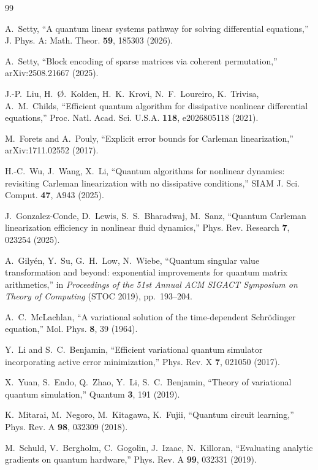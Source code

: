 \documentclass[aps,prx,twocolumn,notitlepage,superscriptaddress,floatfix,10pt]{revtex4-2}
\begin{document}
\begin{thebibliography}{99}

 A.~Setty, ``A quantum linear systems pathway for solving differential equations,''
J. Phys. A: Math. Theor. \textbf{59}, 185303 (2026).

 A.~Setty, ``Block encoding of sparse matrices via coherent permutation,''
arXiv:2508.21667 (2025).

 J.-P.~Liu, H.~{\O}.~Kolden, H.~K.~Krovi, N.~F.~Loureiro, K.~Trivisa, A.~M.~Childs,
``Efficient quantum algorithm for dissipative nonlinear differential equations,'' Proc. Natl. Acad.
Sci. U.S.A. \textbf{118}, e2026805118 (2021).

 M.~Forets and A.~Pouly, ``Explicit error bounds for Carleman linearization,''
arXiv:1711.02552 (2017).

 H.-C.~Wu, J.~Wang, X.~Li, ``Quantum algorithms for nonlinear dynamics: revisiting
Carleman linearization with no dissipative conditions,'' SIAM J. Sci. Comput. \textbf{47}, A943
(2025).

 J.~Gonzalez-Conde, D.~Lewis, S.~S.~Bharadwaj, M.~Sanz, ``Quantum Carleman
linearization efficiency in nonlinear fluid dynamics,'' Phys. Rev. Research \textbf{7}, 023254 (2025).

 A.~Gily{\'e}n, Y.~Su, G.~H.~Low, N.~Wiebe, ``Quantum singular value
transformation and beyond: exponential improvements for quantum matrix arithmetics,'' in
\emph{Proceedings of the 51st Annual ACM SIGACT Symposium on Theory of Computing} (STOC 2019),
pp.~193--204.

 A.~C.~McLachlan, ``A variational solution of the time-dependent Schr\"odinger
equation,'' Mol. Phys. \textbf{8}, 39 (1964).

 Y.~Li and S.~C.~Benjamin, ``Efficient variational quantum simulator incorporating
active error minimization,'' Phys. Rev. X \textbf{7}, 021050 (2017).

 X.~Yuan, S.~Endo, Q.~Zhao, Y.~Li, S.~C.~Benjamin, ``Theory of variational quantum
simulation,'' Quantum \textbf{3}, 191 (2019).

 K.~Mitarai, M.~Negoro, M.~Kitagawa, K.~Fujii, ``Quantum circuit learning,''
Phys. Rev. A \textbf{98}, 032309 (2018).

 M.~Schuld, V.~Bergholm, C.~Gogolin, J.~Izaac, N.~Killoran, ``Evaluating analytic
gradients on quantum hardware,'' Phys. Rev. A \textbf{99}, 032331 (2019).


\end{thebibliography}
\end{document}
